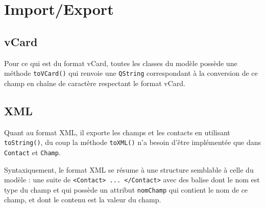 \documentclass[a4paper,12pt]{report}
\begin{document}
\section{Import/Export}

\subsection{vCard}
\par
Pour ce qui est du format vCard, toutes les classes du modèle possède une méthode \texttt{toVCard()} qui renvoie une \texttt{QString} correspondant à la conversion de ce champ en chaîne de caractère respectant le format vCard.

\subsection{XML}
\par
Quant au format XML, il exporte les champs et les contacts en utilisant \texttt{toString()}, du coup la méthode \texttt{toXML()} n'a besoin d'être implémentée que dans \texttt{Contact} et \texttt{Champ}.
\par
Syntaxiquement, le format XML se résume à une structure semblable à celle du modèle : une suite de \texttt{<Contact> ... </Contact>} avec des balise dont le nom est type du champ et qui possède un attribut \texttt{nomChamp} qui contient le nom de ce champ, et dont le contenu est la valeur du champ.
\end{document}
